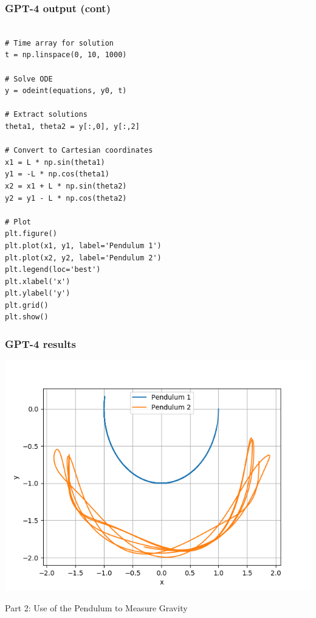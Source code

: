 \documentclass{beamer}
\begin{document}
\begin{frame}[fragile]
\frametitle{GPT-4 output (cont)}
\begin{Verbatim}[fontsize=\tiny]

# Time array for solution
t = np.linspace(0, 10, 1000)

# Solve ODE
y = odeint(equations, y0, t)

# Extract solutions
theta1, theta2 = y[:,0], y[:,2]

# Convert to Cartesian coordinates
x1 = L * np.sin(theta1)
y1 = -L * np.cos(theta1)
x2 = x1 + L * np.sin(theta2)
y2 = y1 - L * np.cos(theta2)

# Plot
plt.figure()
plt.plot(x1, y1, label='Pendulum 1')
plt.plot(x2, y2, label='Pendulum 2')
plt.legend(loc='best')
plt.xlabel('x')
plt.ylabel('y')
plt.grid()
plt.show()
\end{Verbatim}
\end{frame}

\begin{frame}[fragile]
\frametitle{GPT-4 results}
\vskip -0.4in
\includegraphics[width=\textwidth]{Figure_1.png}
\end{frame}

\begin{frame}
\begin{exampleblock}{}
\begin{center}
\vskip 20pt
\Huge
Part 2: Use of the Pendulum to Measure Gravity
\vskip 6pt
\ 
\end{center}
\end{exampleblock}
\end{frame}
\end{document}
